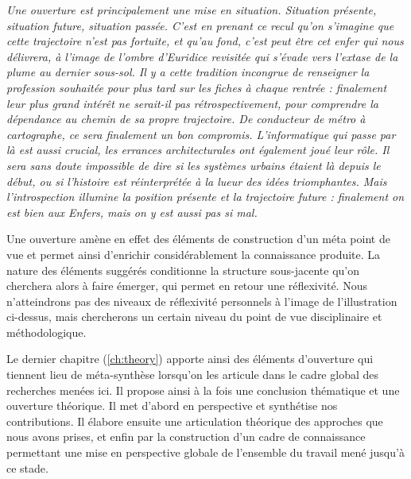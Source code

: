 












\textit{Une ouverture est principalement une mise en situation. Situation présente, situation future, situation passée. C'est en prenant ce recul qu'on s'imagine que cette trajectoire n'est pas fortuite, et qu'au fond, c'est peut être cet enfer qui nous délivrera, à l'image de l'ombre d'Euridice revisitée qui s'évade vers l'extase de la plume au dernier sous-sol. Il y a cette tradition incongrue de renseigner la profession souhaitée pour plus tard sur les fiches à chaque rentrée : finalement leur plus grand intérêt ne serait-il pas rétrospectivement, pour comprendre la dépendance au chemin de sa propre trajectoire. De conducteur de métro à cartographe, ce sera finalement un bon compromis. L'informatique qui passe par là est aussi crucial, les errances architecturales ont également joué leur rôle. Il sera sans doute impossible de dire si les systèmes urbains étaient là depuis le début, ou si l'histoire est réinterprétée à la lueur des idées triomphantes. Mais l'introspection illumine la position présente et la trajectoire future : finalement on est bien aux Enfers, mais on y est aussi pas si mal.}


\bigskip

Une ouverture amène en effet des éléments de construction d'un méta point de vue et permet ainsi d'enrichir considérablement la connaissance produite. La nature des éléments suggérés conditionne la structure sous-jacente qu'on cherchera alors à faire émerger, qui permet en retour une réflexivité. Nous n'atteindrons pas des niveaux de réflexivité personnels à l'image de l'illustration ci-dessus, mais chercherons un certain niveau du point de vue disciplinaire et méthodologique.

Le dernier chapitre (\ref{ch:theory}) apporte ainsi des éléments d'ouverture qui tiennent lieu de méta-synthèse lorsqu'on les articule dans le cadre global des recherches menées ici. Il propose ainsi à la fois une conclusion thématique et une ouverture théorique. Il met d'abord en perspective et synthétise nos contributions. Il élabore ensuite une articulation théorique des approches que nous avons prises, et enfin par la construction d'un cadre de connaissance permettant une mise en perspective globale de l'ensemble du travail mené jusqu'à ce stade.


